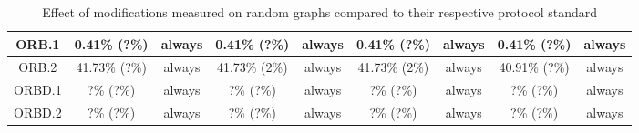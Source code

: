 \begin{table*}
{\begin{tabular}{c|cc|cc|cc|cc|}
\multicolumn{1}{|c|}{ORB.1}       & 0.41\% (?\%)            & always               & 0.41\% (?\%)             & always               & 0.41\% (?\%)            & always               & 0.41\% (?\%)             & always               \\ \hline
\multicolumn{1}{|c|}{ORB.2}       & 41.73\% (?\%)            & always               & 41.73\% (2\%)             & always               & 41.73\% (2\%)            & always               & 40.91\% (?\%)             & always               \\ \hline
\multicolumn{1}{|c|}{ORBD.1}      & ?\% (?\%)            & always               & ?\% (?\%)             & always               & ?\% (?\%)            & always               & ?\% (?\%)             & always               \\ \hline
\multicolumn{1}{|c|}{ORBD.2}      & ?\% (?\%)            & always               & ?\% (?\%)             & always               & ?\% (?\%)            & always               & ?\% (?\%)             & always               \\ \hline
\end{tabular}
    }
  \caption{Effect of modifications measured on random graphs compared to their respective protocol standard}
  \label{eval:individual-results}
\end{table*}

